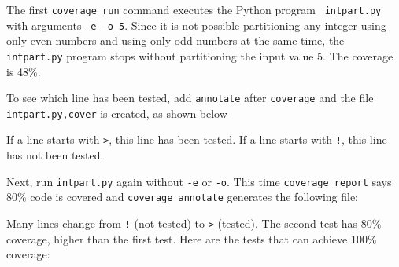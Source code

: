 {The first {\tt coverage run} command executes the Python program {\tt
  intpart.py} with arguments {\tt -e -o 5}.  Since it is not possible
partitioning any integer using only even numbers and using only odd
numbers at the same time, the {\tt intpart.py} program stops without
partitioning the input value 5. The coverage is 48\%.

To see which line has been tested, add {\tt annotate}
after {\tt coverage} and the file {\tt intpart.py,cover}
is created, as shown below

\resetlinenumber[1]
\linenumbers
\begin{tt}
  
\end{tt}
\nolinenumbers

If a line starts with {\tt >}, this line has been tested.
If a line starts with {\tt !}, this line has not been tested.

Next, run {\tt intpart.py} again without {\tt -e} or
{\tt -o}.  This time {\tt coverage report}
says 80\% code is covered and {\tt coverage annotate}
generates the following file:

\resetlinenumber[1]
\linenumbers
\begin{tt}
  
\end{tt}
\nolinenumbers

Many lines change from {\tt !} (not tested) to {\tt >} (tested).
The second test has 80\% coverage, higher than the first test.
Here are the tests that can achieve 100\% coverage:

\begin{comment}
 
\vspace{0.2in}

\noindent
\begin{tabular}{|p{5in}|}\hline
\begin{verbatim}

python3 intpart.py  5 > expected/5
python3 intpart.py -o 5 > expected/o5
python3 intpart.py -e 8 > expected/e8
python3 intpart.py -e 5 > expected/e5
python3 intpart.py -r 5 > expected/r5
python3 intpart.py -s 4 > expected/s4
python3 intpart.py -o -e 4 > expected/oe4
python3 intpart.py  > expected/noargs
python3 intpart.py -h > expected/h

coverage erase
coverage run intpart.py -o 5
coverage run -a intpart.py -e 8
coverage run -a intpart.py -e 5
coverage run -a intpart.py -o 7
coverage run -a intpart.py -r 5
coverage run -a intpart.py -s 4
coverage run -a intpart.py -o -e 4
coverage run -a intpart.py
coverage run -a intpart.py -h
coverage report


\end{comment}}
